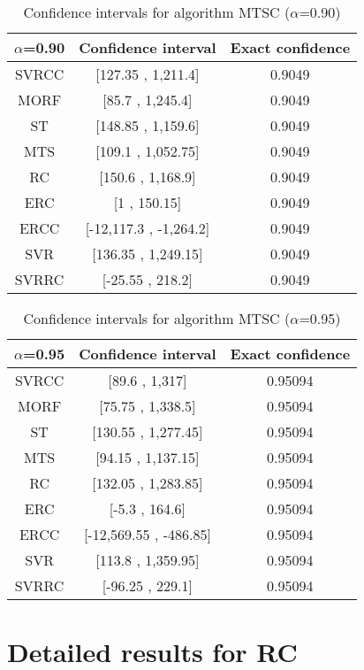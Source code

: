 \documentclass[a4paper,10pt]{article}
\begin{document}
\begin{table}[!htp]
\centering\small
\begin{tabular}{
|c|c|c|}
\hline
 $\alpha$=0.90 & Confidence interval & Exact confidence \\ \hline 
SVRCC & [127.35 , 1,211.4] & 0.9049\\ \hline 
MORF & [85.7 , 1,245.4] & 0.9049\\ \hline 
ST & [148.85 , 1,159.6] & 0.9049\\ \hline 
MTS & [109.1 , 1,052.75] & 0.9049\\ \hline 
RC & [150.6 , 1,168.9] & 0.9049\\ \hline 
ERC & [1 , 150.15] & 0.9049\\ \hline 
ERCC & [-12,117.3 , -1,264.2] & 0.9049\\ \hline 
SVR & [136.35 , 1,249.15] & 0.9049\\ \hline 
SVRRC & [-25.55 , 218.2] & 0.9049\\ \hline 

\end{tabular}
\caption{Confidence intervals for algorithm MTSC ($\alpha$=0.90)}
\end{table}
\begin{table}[!htp]
\centering\small
\begin{tabular}{
|c|c|c|}
\hline
 $\alpha$=0.95 & Confidence interval & Exact confidence \\ \hline 
SVRCC & [89.6 , 1,317] & 0.95094\\ \hline 
MORF & [75.75 , 1,338.5] & 0.95094\\ \hline 
ST & [130.55 , 1,277.45] & 0.95094\\ \hline 
MTS & [94.15 , 1,137.15] & 0.95094\\ \hline 
RC & [132.05 , 1,283.85] & 0.95094\\ \hline 
ERC & [-5.3 , 164.6] & 0.95094\\ \hline 
ERCC & [-12,569.55 , -486.85] & 0.95094\\ \hline 
SVR & [113.8 , 1,359.95] & 0.95094\\ \hline 
SVRRC & [-96.25 , 229.1] & 0.95094\\ \hline 

\end{tabular}
\caption{Confidence intervals for algorithm MTSC ($\alpha$=0.95)}
\end{table}

 \clearpage 


\section{Detailed results for RC}
\end{document}

